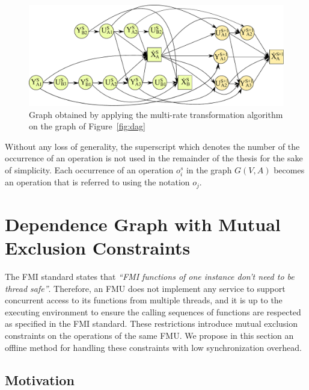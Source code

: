 \begin{figure}[htb]
\centering
  \includegraphics[scale=0.5]{figures/Operation_Graph_Two_Models_Multirate}
\caption{Graph obtained by applying the multi-rate transformation algorithm on the graph of Figure~\ref{fig:dag}}
\label{fig:dagmr}
\end{figure}

Without any loss of generality, the superscript which denotes the number of the occurrence of an operation is not used in the remainder of the thesis for the sake of simplicity. Each occurrence of an operation $o_i^s$ in the graph $G(V,A)$ becomes an operation that is referred to using the notation $o_j$.

\section{Dependence Graph with Mutual Exclusion Constraints}
The FMI standard states that \textit{``FMI functions of one instance don't need to be thread safe''}. Therefore, an FMU does not implement any service to support concurrent access to its functions from multiple threads, and it is up to the executing environment to ensure the calling sequences of functions are respected as specified in the FMI standard. These restrictions introduce mutual exclusion constraints on the operations of the same FMU. We propose in this section an offline method for handling these constraints with low synchronization overhead.

\subsection{Motivation}

